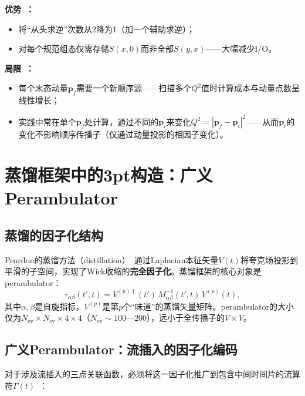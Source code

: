\documentclass[12pt,a4paper]{ctexart}
\theoremstyle{definition}
\begin{document}
\textbf{优势~\cite{propagatorSolvers2026}：}
\begin{itemize}[leftmargin=*]
    \item 将``从头求逆''次数从2降为1（加一个辅助求逆）；
    \item 对每个规范组态仅需存储$S(x,0)$而非全部$S(y,x)$——大幅减少I/O。
\end{itemize}

\textbf{局限~\cite{propagatorSolvers2026,formFactors2026}：}
\begin{itemize}[leftmargin=*]
    \item 每个末态动量$\mathbf{p}_f$需要一个新顺序源——扫描多个$Q^2$值时计算成本与动量点数呈线性增长；
    \item 实践中常在单个$\mathbf{p}_f$处计算，通过不同的$\mathbf{p}_i$来变化$Q^2 = |\mathbf{p}_f - \mathbf{p}_i|^2$——从而$\mathbf{p}_i$的变化不影响顺序传播子（仅通过动量投影的相因子变化）。
\end{itemize}

\section{蒸馏框架中的3pt构造：广义Perambulator}

\subsection{蒸馏的因子化结构}

Peardon的蒸馏方法（distillation）~\cite{distillation2026,wickContraction2026}通过Laplacian本征矢量$V(t)$将夸克场投影到平滑的子空间，实现了Wick收缩的\textbf{完全因子化}。蒸馏框架的核心对象是perambulator：
\begin{equation}\label{eq:perambulator}
    \tau_{\alpha\beta}(t', t) = V^{(p)\dagger}(t')\,M^{-1}_{\alpha\beta}(t',t)\,V^{(p)}(t),
\end{equation}
其中$\alpha,\beta$是自旋指标，$V^{(p)}$是第$p$个``味道''的蒸馏矢量矩阵。perambulator的大小仅为$N_{\text{ev}} \times N_{\text{ev}} \times 4 \times 4$（$N_{\text{ev}} \sim 100$—$200$），远小于全传播子的$V \times V$。

\subsection{广义Perambulator：流插入的因子化编码}

对于涉及流插入的三点关联函数，必须将这一因子化推广到包含中间时间片的流算符$\Gamma(t)$~\cite{distillation2026,wickContraction2026}：
\end{document}
